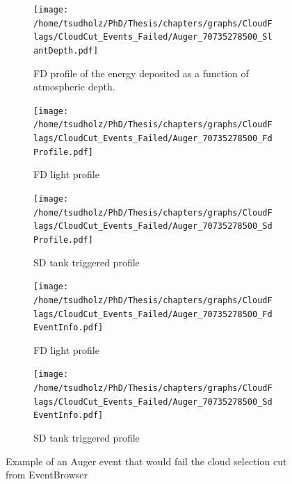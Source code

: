 \begin{figure}
\centering
 \vspace{2cm}
  \begin{subfigure}[b]{\textwidth}
  \centering
  \texttt{[image: /home/tsudholz/PhD/Thesis/chapters/graphs/CloudFlags/CloudCut\_Events\_Failed/Auger\_70735278500\_SlantDepth.pdf]}
  \caption{FD profile of the energy deposited as a function of atmospheric depth.}
  \end{subfigure}
 \vspace{0.5cm}
  \begin{subfigure}[b]{0.45\textwidth}
  	\centering
  	\texttt{[image: /home/tsudholz/PhD/Thesis/chapters/graphs/CloudFlags/CloudCut\_Events\_Failed/Auger\_70735278500\_FdProfile.pdf]}
  	\caption{FD light profile}
  \end{subfigure}
  \begin{subfigure}[b]{0.45\textwidth}
  	\centering
  	\texttt{[image: /home/tsudholz/PhD/Thesis/chapters/graphs/CloudFlags/CloudCut\_Events\_Failed/Auger\_70735278500\_SdProfile.pdf]}
  	\caption{SD tank triggered profile}
  \end{subfigure}

  \begin{subfigure}[b]{0.45\textwidth}
  	\centering
	\texttt{[image: /home/tsudholz/PhD/Thesis/chapters/graphs/CloudFlags/CloudCut\_Events\_Failed/Auger\_70735278500\_FdEventInfo.pdf]}
  	\caption{FD light profile}
  \end{subfigure}
  \begin{subfigure}[b]{0.45\textwidth}
  	\centering
	\texttt{[image: /home/tsudholz/PhD/Thesis/chapters/graphs/CloudFlags/CloudCut\_Events\_Failed/Auger\_70735278500\_SdEventInfo.pdf]}
  	\caption{SD tank triggered profile}
  \end{subfigure}
  \caption{Example of an Auger event that would fail the cloud selection cut from EventBrowser}
\end{figure}

